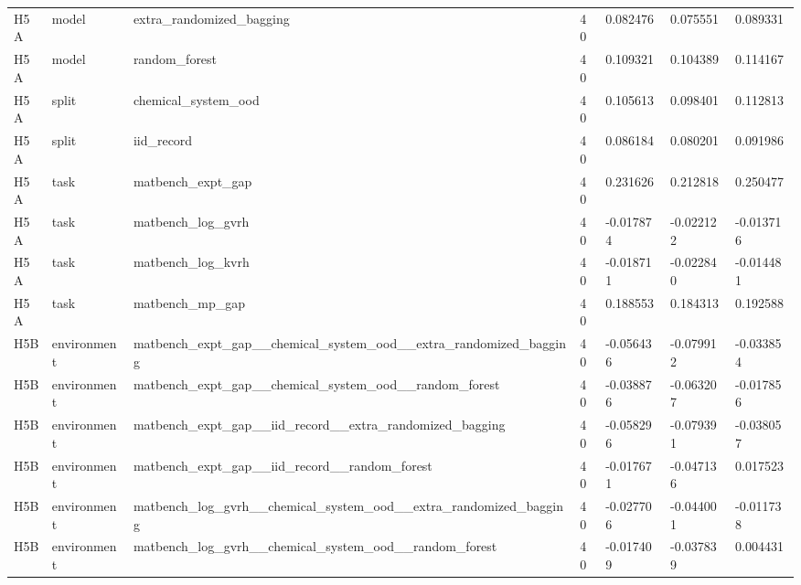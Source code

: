 \documentclass[10pt]{article}
\begin{document}
\begin{landscape}
\begin{longtable}{L{.35in}L{.6in}L{3.55in}L{.4in}L{.88in}L{.88in}L{.88in}}
H5A & model & extra\_\allowbreak{}randomized\_\allowbreak{}bagging & 40 & 0.082476 & 0.075551 & 0.089331\\
H5A & model & random\_\allowbreak{}forest & 40 & 0.109321 & 0.104389 & 0.114167\\
H5A & split & chemical\_\allowbreak{}system\_\allowbreak{}ood & 40 & 0.105613 & 0.098401 & 0.112813\\
H5A & split & iid\_\allowbreak{}record & 40 & 0.086184 & 0.080201 & 0.091986\\
H5A & task & matbench\_\allowbreak{}expt\_\allowbreak{}gap & 40 & 0.231626 & 0.212818 & 0.250477\\
H5A & task & matbench\_\allowbreak{}log\_\allowbreak{}gvrh & 40 & -0.017874 & -0.022122 & -0.013716\\
H5A & task & matbench\_\allowbreak{}log\_\allowbreak{}kvrh & 40 & -0.018711 & -0.022840 & -0.014481\\
H5A & task & matbench\_\allowbreak{}mp\_\allowbreak{}gap & 40 & 0.188553 & 0.184313 & 0.192588\\
H5B & environment & matbench\_\allowbreak{}expt\_\allowbreak{}gap\_\allowbreak{}\_\allowbreak{}chemical\_\allowbreak{}system\_\allowbreak{}ood\_\allowbreak{}\_\allowbreak{}extra\_\allowbreak{}randomized\_\allowbreak{}bagging & 40 & -0.056436 & -0.079912 & -0.033854\\
H5B & environment & matbench\_\allowbreak{}expt\_\allowbreak{}gap\_\allowbreak{}\_\allowbreak{}chemical\_\allowbreak{}system\_\allowbreak{}ood\_\allowbreak{}\_\allowbreak{}random\_\allowbreak{}forest & 40 & -0.038876 & -0.063207 & -0.017856\\
H5B & environment & matbench\_\allowbreak{}expt\_\allowbreak{}gap\_\allowbreak{}\_\allowbreak{}iid\_\allowbreak{}record\_\allowbreak{}\_\allowbreak{}extra\_\allowbreak{}randomized\_\allowbreak{}bagging & 40 & -0.058296 & -0.079391 & -0.038057\\
H5B & environment & matbench\_\allowbreak{}expt\_\allowbreak{}gap\_\allowbreak{}\_\allowbreak{}iid\_\allowbreak{}record\_\allowbreak{}\_\allowbreak{}random\_\allowbreak{}forest & 40 & -0.017671 & -0.047136 & 0.017523\\
H5B & environment & matbench\_\allowbreak{}log\_\allowbreak{}gvrh\_\allowbreak{}\_\allowbreak{}chemical\_\allowbreak{}system\_\allowbreak{}ood\_\allowbreak{}\_\allowbreak{}extra\_\allowbreak{}randomized\_\allowbreak{}bagging & 40 & -0.027706 & -0.044001 & -0.011738\\
H5B & environment & matbench\_\allowbreak{}log\_\allowbreak{}gvrh\_\allowbreak{}\_\allowbreak{}chemical\_\allowbreak{}system\_\allowbreak{}ood\_\allowbreak{}\_\allowbreak{}random\_\allowbreak{}forest & 40 & -0.017409 & -0.037839 & 0.004431\\

\end{longtable}
\end{landscape}
\end{document}
